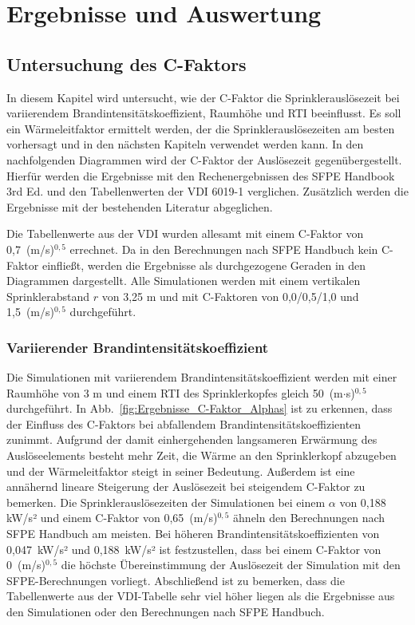 \chapter{Ergebnisse und Auswertung}
\label{cha:Versuchsauswertung}


\section{Untersuchung des C-Faktors}
\label{sec:Untersuchungc-faktor}
In diesem Kapitel wird untersucht, wie der C-Faktor die Sprinklerauslösezeit bei variierendem Brandintensitätskoeffizient, Raumhöhe und RTI beeinflusst. Es soll ein Wärmeleitfaktor ermittelt werden, der die Sprinklerauslösezeiten am besten vorhersagt und in den nächsten Kapiteln verwendet werden kann. 
In den nachfolgenden Diagrammen wird der C-Faktor der Auslösezeit gegenübergestellt. Hierfür werden die Ergebnisse mit den Rechenergebnissen des SFPE Handbook 3rd Ed. und den Tabellenwerten der VDI 6019-1 verglichen. Zusätzlich werden die Ergebnisse mit der bestehenden Literatur abgeglichen. 

Die Tabellenwerte aus der VDI wurden allesamt mit einem C-Faktor von 0,7~(m/s)$^{0,5}$ errechnet. Da in den Berechnungen nach SFPE Handbuch kein C-Faktor einfließt, werden die Ergebnisse als durchgezogene Geraden in den Diagrammen dargestellt.  Alle Simulationen werden mit einem vertikalen Sprinklerabstand $r$ von 3,25 m und mit C-Faktoren von 0,0/0,5/1,0 und 1,5~(m/s)$^{0,5}$ durchgeführt. 



\subsection{Variierender Brandintensitätskoeffizient}

Die Simulationen mit variierendem Brandintensitätskoeffizient werden mit einer Raumhöhe von 3 m und einem RTI des Sprinklerkopfes gleich 50~(m$\cdot$s)$^{0,5}$ durchgeführt. In Abb.~\ref{fig:Ergebnisse_C-Faktor_Alphas} ist zu erkennen, dass der Einfluss des C-Faktors bei abfallendem Brand\-in\-ten\-si\-täts\-ko\-ef\-fi\-zien\-ten zunimmt. Aufgrund der damit einhergehenden langsameren Erwärmung des Auslöseelements besteht mehr Zeit, die Wärme an den Sprinklerkopf abzugeben und der Wärmeleitfaktor steigt in seiner Bedeutung.
Außerdem ist eine annähernd lineare Steigerung der Auslösezeit bei steigendem C-Faktor zu bemerken.
Die Sprinklerauslösezeiten der Simulationen bei einem $\alpha$ von 0,188 kW/s² und einem C-Faktor von 0,65~(m/s)$^{0,5}$ ähneln den Berechnungen nach SFPE Handbuch am meisten. Bei höheren Brand\-in\-ten\-si\-täts\-ko\-ef\-fi\-zien\-ten von 0,047~kW/s² und 0,188~kW/s² ist festzustellen, dass bei einem C-Faktor von 0~(m/s)$^{0,5}$ die höchste Übereinstimmung der Auslösezeit der Simulation mit den SFPE-Berechnungen vorliegt. Abschließend ist zu bemerken, dass die Tabellenwerte aus der VDI-Tabelle sehr viel höher liegen als die Ergebnisse aus den Simulationen oder den Berechnungen nach SFPE Handbuch.


